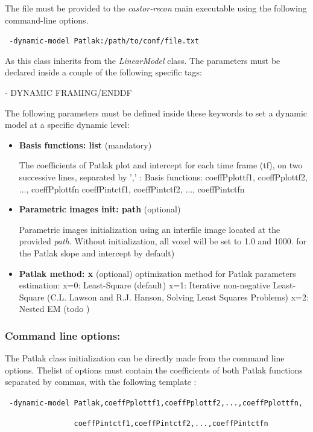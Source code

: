 \documentclass[a4paper, 11pt]{article}
\begin{document}
The file must be provided to the \textit{castor-recon} main executable using the following command-line options.

\bigskip
\verb| -dynamic-model Patlak:/path/to/conf/file.txt|
\bigskip

As this class inherits from the \textit{LinearModel} class. The parameters must be declared inside a couple of the following specific tags:
 
  - DYNAMIC FRAMING/ENDDF 


The following parameters must be defined inside these keywords to set a dynamic model at a specific dynamic level:

\begin{itemize}

\item \textbf{Basis functions: list}	(mandatory)
 
The coefficients of Patlak plot and intercept for each time frame (tf), on two successive lines, separated by ',' :
Basis functions: 
coeffPplottf1, coeffPplottf2, ..., coeffPplottfn
coeffPintctf1, coeffPintctf2, ..., coeffPintctfn


\item \textbf{Parametric images init: path} (optional) 

Parametric images initialization using an interfile image located at the provided \textit{path}. Without initialization, all voxel will be set to 1.0 and 1000. for the Patlak slope and intercept by default)


\item \textbf{Patlak method: x} (optional) optimization method for Patlak parameters estimation: 
x=0: Least-Square (default) 
x=1: Iterative non-negative Least-Square (C.L. Lawson and R.J. Hanson, Solving Least Squares Problems)
x=2: Nested EM (todo )
\end{itemize}


\subsubsection{Command line options:} 
\label{sss_patlak_list} 

The Patlak class initialization can be directly made from the command line options. Thelist of options must contain the coefficients of both Patlak functions separated by commas, with the following template :

\bigskip
\verb| -dynamic-model Patlak,coeffPplottf1,coeffPplottf2,...,coeffPplottfn,|

\verb|                coeffPintctf1,coeffPintctf2,...,coeffPintctfn|
\bigskip
\end{document}
